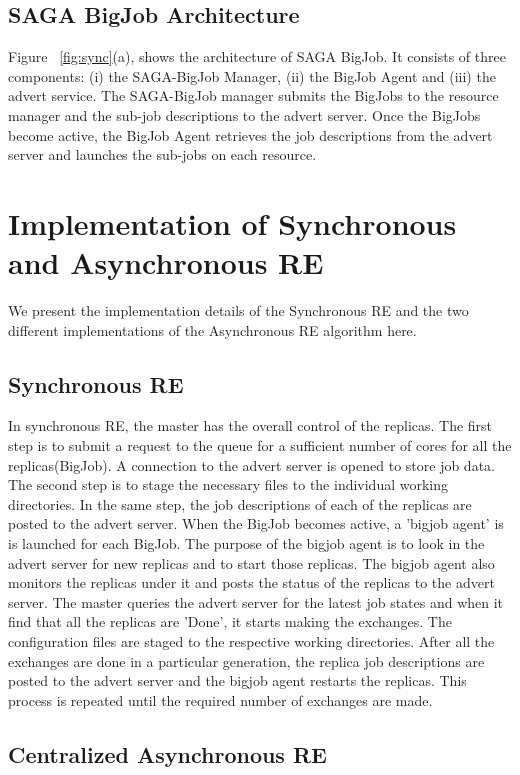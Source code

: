 \documentclass[a4paper,10pt]{article}
\begin{document}
\subsection{SAGA BigJob Architecture}

Figure ~\ref{fig:sync}(a), shows the architecture of SAGA BigJob. It consists of three components: (i) the SAGA-BigJob Manager, (ii) the BigJob Agent and (iii) the advert service. The SAGA-BigJob manager submits the BigJobs to the resource manager and the sub-job descriptions to the advert server. Once the BigJobs become active, the BigJob Agent retrieves the job descriptions from the advert server and launches the sub-jobs on each resource. 

\section{Implementation of Synchronous and Asynchronous RE}
We present the implementation details of the Synchronous RE and the two different implementations of the Asynchronous RE algorithm here.

\subsection{Synchronous RE}

In synchronous RE, the master has the overall control of the replicas. The first step is to submit a request to the queue for a sufficient number of cores for all the replicas(BigJob). A connection to the advert server is opened to store job data. The second step is to stage the necessary files to the individual working directories. In the same step, the job descriptions of each of the replicas are posted to the advert server. When the BigJob becomes active, a 'bigjob agent' is is launched for each BigJob. The purpose of the bigjob agent is to look in the advert server for new replicas and to start those replicas. The bigjob agent also monitors the replicas under it and posts the status of the replicas to the advert server. The master queries the advert server for the latest job states and when it find that all the replicas are 'Done', it starts making the exchanges. The configuration files are staged to the respective working directories. After all the exchanges are done in a particular generation, the replica job descriptions are posted to the advert server and the bigjob agent restarts the replicas. This process is repeated until the required number of exchanges are made. 


\subsection{Centralized Asynchronous RE}
\end{document}
